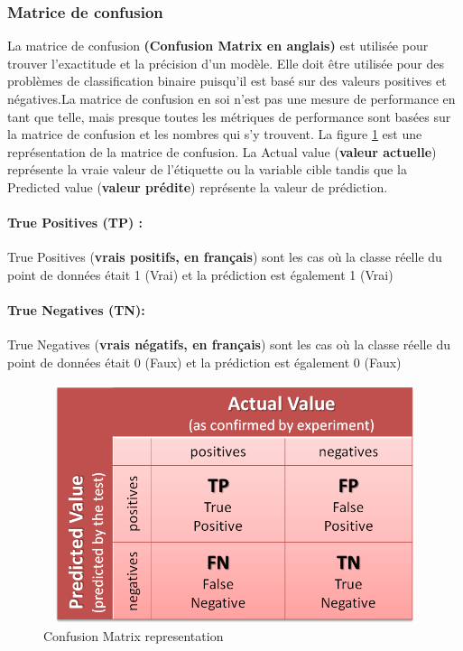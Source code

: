 \documentclass[12pt, french]{report}
\begin{document}

\subsubsection{Matrice de confusion}
La matrice de confusion \textbf{(Confusion Matrix en anglais)} est utilisée pour trouver l'exactitude et la précision d'un modèle. Elle doit être utilisée pour des problèmes de classification binaire puisqu'il est basé sur des valeurs positives et négatives.La matrice de confusion en soi n'est pas une mesure de performance en tant que telle, mais presque toutes les métriques de performance sont basées sur la matrice de confusion et les nombres qui s'y trouvent. La figure \ref{confusionmatrix} est une représentation de la matrice de confusion. La Actual value (\textbf{valeur actuelle}) représente la vraie valeur de l'étiquette ou la variable cible tandis que la Predicted value (\textbf{valeur prédite}) représente la valeur de prédiction. 
\paragraph*{True Positives (TP) :}
True Positives (\textbf{vrais positifs, en français}) sont les cas où la classe réelle du point de données était 1 (Vrai) et la prédiction est également 1 (Vrai)
\paragraph*{True Negatives (TN):}
True Negatives (\textbf{vrais négatifs, en français}) sont les cas où la classe réelle du point de données était 0 (Faux) et la prédiction est également 0 (Faux)

\begin{figure}[h]
	\includegraphics[width=14cm, height=7cm]{images/confusionmatrix.png}
	\caption{Confusion Matrix representation \cite{key25}}
	\label{confusionmatrix}
\end{figure}
\end{document}
